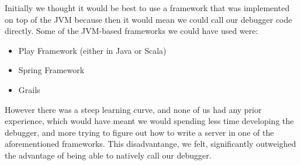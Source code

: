 \documentclass[11pt, a4paper]{article}
\begin{document}
Initially we thought it would be best to use a framework that was implemented on
top of the JVM because then it would mean we could call our debugger code
directly.  Some of the JVM-based frameworks we could have used were:
\begin{itemize}
  \item Play Framework (either in Java or Scala)
  \item Spring Framework
  \item Grails
\end{itemize}

However there was a steep learning curve, and none of us had any prior
experience, which would have meant we would spending less time developing the
debugger, and more trying to figure out how to write a server in one of the
aforementioned frameworks.  This disadvantange, we felt, significantly
outweighed the advantage of being able to natively call our debugger.
\end{document}
